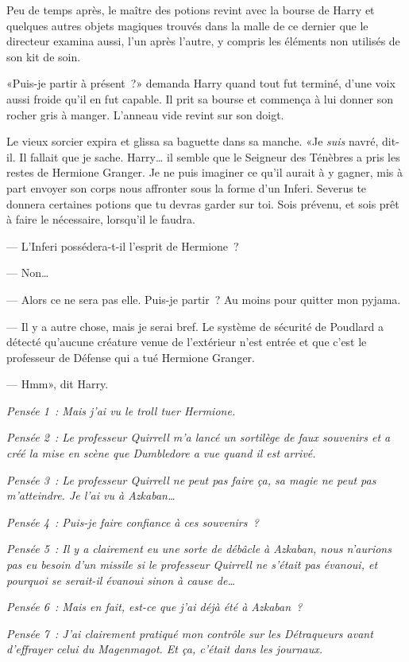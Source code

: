Peu de temps après, le maître des potions revint avec la bourse de Harry et quelques autres objets magiques trouvés dans la malle de ce dernier que le directeur examina aussi, l'un après l'autre, y compris les éléments non utilisés de son kit de soin.

«Puis-je partir à présent~?» demanda Harry quand tout fut terminé, d'une voix aussi froide qu'il en fut capable. Il prit sa bourse et commença à lui donner son rocher gris à manger. L'anneau vide revint sur son doigt.

Le vieux sorcier expira et glissa sa baguette dans sa manche. «Je \emph{suis} navré, dit-il. Il fallait que je sache. Harry… il semble que le Seigneur des Ténèbres a pris les restes de Hermione Granger. Je ne puis imaginer ce qu'il aurait à y gagner, mis à part envoyer son corps nous affronter sous la forme d'un Inferi. Severus te donnera certaines potions que tu devras garder sur toi. Sois prévenu, et sois prêt à faire le nécessaire, lorsqu'il le faudra.

--- L'Inferi possédera-t-il l'esprit de Hermione~?

--- Non…

--- Alors ce ne sera pas elle. Puis-je partir~? Au moins pour quitter mon pyjama.

--- Il y a autre chose, mais je serai bref. Le système de sécurité de Poudlard a détecté qu'aucune créature venue de l'extérieur n'est entrée et que c'est le professeur de Défense qui a tué Hermione Granger.

--- Hmm», dit Harry.

\emph{Pensée 1~: Mais j'ai vu le troll tuer Hermione.}

\emph{Pensée 2~: Le professeur Quirrell m'a lancé un sortilège de faux souvenirs et a créé la mise en scène que Dumbledore a vue quand il est arrivé.}

\emph{Pensée 3~: Le professeur Quirrell ne peut pas faire ça, sa magie ne peut pas m'atteindre. Je l'ai vu à Azkaban…}

\emph{Pensée 4~: Puis-je faire confiance à ces souvenirs~?}

\emph{Pensée 5~: Il y a clairement eu une sorte de débâcle à Azkaban, nous n'aurions pas eu besoin d'un missile si le professeur Quirrell ne s'était pas évanoui, et pourquoi se serait-il évanoui sinon à cause de…}

\emph{Pensée 6~: Mais en fait, est-ce que j'ai déjà été à Azkaban~?}

\emph{Pensée 7~: J'ai clairement pratiqué mon contrôle sur les Détraqueurs avant d'effrayer celui du Magenmagot. Et \emph{ça}, c'était dans les journaux.}

